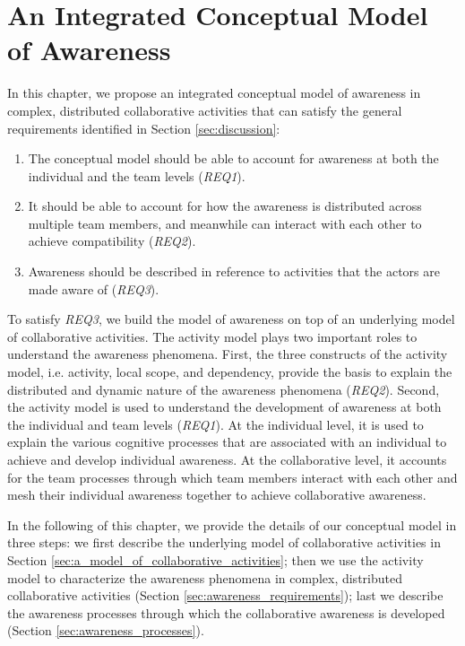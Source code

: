 \graphicspath{{Figures/}}

\chapter{An Integrated Conceptual Model of Awareness} %
\label{cha:the_conceptual_framework}
In this chapter, we propose an integrated conceptual model of awareness in complex, distributed collaborative activities that can satisfy the general requirements identified in Section \ref{sec:discussion}:

\begin{enumerate}
	\item The conceptual model should be able to account for awareness at both the individual and the team levels (\emph{REQ1}).
	\item It should be able to account for how the awareness is distributed across multiple team members, and meanwhile can interact with each other to achieve compatibility (\emph{REQ2}). 
	\item Awareness should be described in reference to activities that the actors are made aware of (\emph{REQ3}).
\end{enumerate}

To satisfy \emph{REQ3}, we build the model of awareness on top of an underlying model of collaborative activities. The activity model plays two important roles to understand the awareness phenomena. First, the three constructs of the activity model, i.e. activity, local scope, and dependency, provide the basis to explain the distributed and dynamic nature of the awareness phenomena (\emph{REQ2}). Second, the activity model is used to understand the development of awareness at both the individual and team levels (\emph{REQ1}). At the individual level, it is used to explain the various cognitive processes that are associated with an individual to achieve and develop individual awareness. At the collaborative level, it accounts for the team processes through which team members interact with each other and mesh their individual awareness together to achieve collaborative awareness. 

In the following of this chapter, we provide the details of our conceptual model in three steps: we first describe the underlying model of collaborative activities in Section \ref{sec:a_model_of_collaborative_activities}; then we use the activity model to characterize the awareness phenomena in complex, distributed collaborative activities (Section \ref{sec:awareness_requirements}); last we describe the awareness processes through which the collaborative awareness is developed (Section \ref{sec:awareness_processes}).

